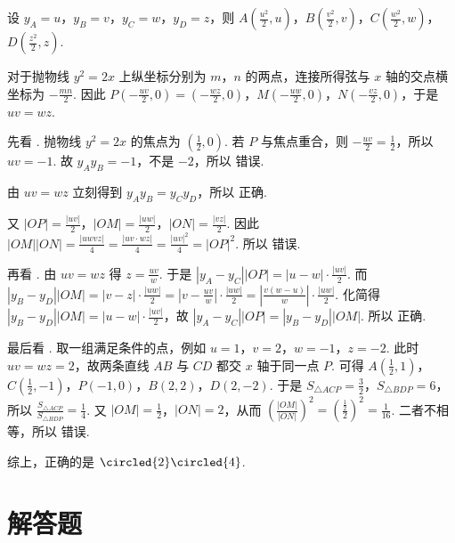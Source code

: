 \begin{solution}
设 \(y_A=u\)，\(y_B=v\)，\(y_C=w\)，\(y_D=z\)，则 \(A\left( \frac{u^2}{2},u \right)\)，\(B\left( \frac{v^2}{2},v \right)\)，\(C\left( \frac{w^2}{2},w \right)\)，\(D\left( \frac{z^2}{2},z \right)\).

对于抛物线 \(y^2=2x\) 上纵坐标分别为 \(m\)，\(n\) 的两点，连接所得弦与 \(x\) 轴的交点横坐标为 \(-\frac{mn}{2}\). 因此 \(P\left( -\frac{uv}{2},0 \right)=\left( -\frac{wz}{2},0 \right)\)，\(M\left( -\frac{uw}{2},0 \right)\)，\(N\left( -\frac{vz}{2},0 \right)\)，于是 \(uv=wz\).

先看 . 抛物线 \(y^2=2x\) 的焦点为 \(\left( \frac{1}{2},0 \right)\). 若 \(P\) 与焦点重合，则 \(-\frac{uv}{2}=\frac{1}{2}\)，所以 \(uv=-1\). 故 \(y_Ay_B=-1\)，不是 \(-2\)，所以  错误.

由 \(uv=wz\) 立刻得到 \(y_Ay_B=y_Cy_D\)，所以  正确.

又 \(|OP|=\frac{|uv|}{2}\)，\(|OM|=\frac{|uw|}{2}\)，\(|ON|=\frac{|vz|}{2}\). 因此 \(|OM||ON|=\frac{|uwvz|}{4}=\frac{|uv\cdot wz|}{4}=\frac{|uv|^2}{4}=|OP|^2\). 所以  错误.

再看 . 由 \(uv=wz\) 得 \(z=\frac{uv}{w}\). 于是 \(\left| y_A-y_C \right||OP|=\left| u-w \right|\cdot \frac{|uv|}{2}\). 而 \(\left| y_B-y_D \right||OM|=\left| v-z \right|\cdot \frac{|uw|}{2}=\left| v-\frac{uv}{w} \right|\cdot \frac{|uw|}{2}=\left| \frac{v\left( w-u \right)}{w} \right|\cdot \frac{|uw|}{2}\). 化简得 \(\left| y_B-y_D \right||OM|=\left| u-w \right|\cdot \frac{|uv|}{2}\)，故 \(\left| y_A-y_C \right||OP|=\left| y_B-y_D \right||OM|\). 所以  正确.

最后看 . 取一组满足条件的点，例如 \(u=1\)，\(v=2\)，\(w=-1\)，\(z=-2\). 此时 \(uv=wz=2\)，故两条直线 \(AB\) 与 \(CD\) 都交 \(x\) 轴于同一点 \(P\). 可得 \(A\left( \frac{1}{2},1 \right)\)，\(C\left( \frac{1}{2},-1 \right)\)，\(P(-1,0)\)，\(B(2,2)\)，\(D(2,-2)\). 于是 \(S_{\triangle ACP}=\frac{3}{2}\)，\(S_{\triangle BDP}=6\)，所以 \(\frac{S_{\triangle ACP}}{S_{\triangle BDP}}=\frac{1}{4}\). 又 \(|OM|=\frac{1}{2}\)，\(|ON|=2\)，从而 \(\left( \frac{|OM|}{|ON|} \right)^2=\left( \frac{\frac{1}{2}}{2} \right)^2=\frac{1}{16}\). 二者不相等，所以  错误.

综上，正确的是 \(\circled{2}\circled{4}\).
\end{solution}
\section{解答题}

